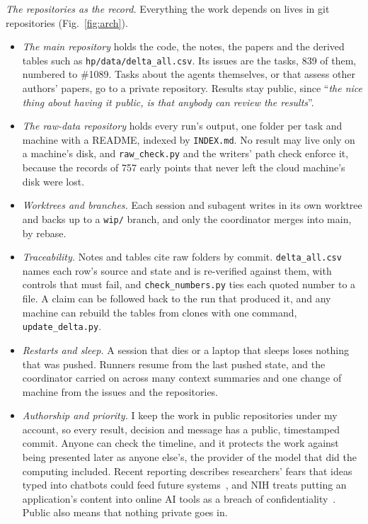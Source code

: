 \documentclass[aps,prd,onecolumn,superscriptaddress,nofootinbib,10pt]{revtex4-2}
\newcommand{\file}[1]{\texttt{#1}}
\newcommand{\prompt}[1]{``\textit{#1}''}
\begin{document}
\emph{The repositories as the record.} Everything the work depends on lives in git repositories (Fig.~\ref{fig:arch}).
\begin{itemize}
\item \emph{The main repository} holds the code, the notes, the papers and the derived tables such as
\file{hp/data/delta\_all.csv}. Its issues are the tasks, 839 of them, numbered to \#1089. Tasks about
the agents themselves, or that assess other authors' papers, go to a private repository. Results stay public, since
\prompt{the nice thing about having it public, is that anybody can review the results}.
\item \emph{The raw-data repository} holds every run's output, one folder per task and machine with a README, indexed by
\file{INDEX.md}. No result may live only on a machine's disk, and \file{raw\_check.py} and the writers' path check
enforce it, because the records of 757 early points that never left the cloud machine's disk were lost.
\item \emph{Worktrees and branches.} Each session and subagent writes in its own worktree and backs up to a
\file{wip/} branch, and only the coordinator merges into main, by rebase.
\item \emph{Traceability.} Notes and tables cite raw folders by commit. \file{delta\_all.csv} names each row's source and
state and is re-verified against them, with controls that must fail, and \file{check\_numbers.py} ties each quoted number
to a file. A claim can be followed back to the run that produced it, and any machine can rebuild the tables from clones
with one command, \file{update\_delta.py}.
\item \emph{Restarts and sleep.} A session that dies or a laptop that sleeps loses nothing that was pushed. Runners resume
from the last pushed state, and the coordinator carried on across many context summaries and one change of machine from
the issues and the repositories.
\item \emph{Authorship and priority.} I keep the work in public repositories under my account, so every result, decision
and message has a public, timestamped commit. Anyone can check the timeline, and it protects the work against being
presented later as anyone else's, the provider of the model that did the computing included. Recent reporting describes
researchers' fears that ideas typed into chatbots could feed future systems~\cite{Metz2026}, and NIH treats putting an
application's content into online AI tools as a breach of confidentiality~\cite{NIH2023}. Public also means that nothing
private goes in.
\end{itemize}
\end{document}
